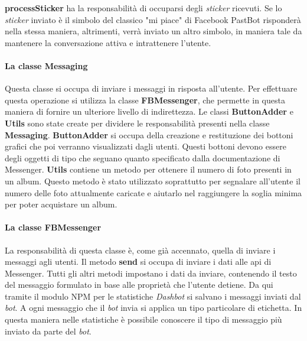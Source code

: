 \textbf{processSticker} ha la responsabilità di occuparsi degli \textit{sticker}
ricevuti. Se lo \textit{sticker} inviato è il simbolo del classico "mi piace"
di Facebook PastBot risponderà nella stessa maniera, altrimenti, verrà inviato
un altro simbolo, in maniera tale da mantenere la conversazione attiva e
intrattenere l'utente.

\paragraph*{La classe Messaging} Questa classe si occupa di inviare i messaggi
in risposta all'utente. Per effettuare questa operazione si utilizza la classe
\textbf{FBMessenger}, che permette in questa maniera di fornire un ulteriore
livello di indirettezza. Le classi \textbf{ButtonAdder} e \textbf{Utils} sono
state create per dividere le responsabilità presenti nella classe
\textbf{Messaging}. \textbf{ButtonAdder} si occupa della creazione e
restituzione dei bottoni grafici che poi verranno visualizzati dagli utenti.
Questi bottoni devono essere degli oggetti di tipo
 che seguano quanto specificato dalla
documentazione di Messenger.
\textbf{Utils} contiene un metodo per ottenere il numero di foto presenti in un
album. Questo metodo è stato utilizzato soprattutto per segnalare all'utente il
numero delle foto attualmente caricate e aiutarlo nel raggiungere la soglia
minima per poter acquistare un album.

\paragraph*{La classe FBMessenger} La responsabilità di questa classe è, come
già accennato, quella di inviare i messaggi agli utenti. Il metodo
\textbf{send} si occupa di inviare i dati alle \gls{api} di Messenger. Tutti gli
altri metodi impostano i dati da inviare, contenendo il testo del messaggio
formulato in base alle proprietà che l'utente detiene. Da qui tramite il modulo
NPM per le statistiche \textit{Dashbot} si salvano i messaggi inviati dal
\textit{bot}. A ogni messaggio che il \textit{bot} invia si applica un tipo
particolare di etichetta. In questa maniera nelle statistiche è possibile
conoscere il tipo di messaggio più inviato da parte del \textit{bot}.
